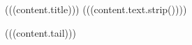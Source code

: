 
\begin{exercise}{(((content.title)))}
(((content.text.strip())))
\end{exercise}
(((content.tail)))
